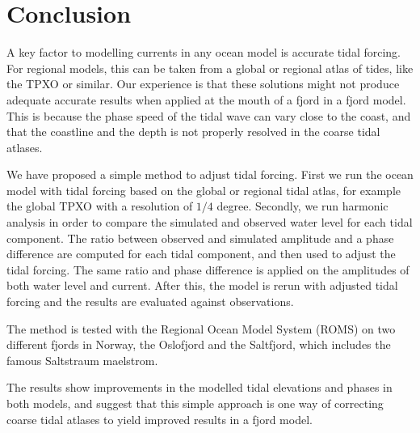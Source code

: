 \section{Conclusion}

A key factor to modelling currents in any ocean model is accurate tidal forcing. For regional models, this can be taken from a global or regional atlas of tides, like the TPXO or similar. Our experience is that these solutions might not produce adequate accurate results when applied at the mouth of a fjord in a fjord model. This is because the phase speed of the tidal wave can vary close to the coast, and that the coastline and the depth is not properly resolved in the coarse tidal atlases.

We have proposed a simple method to adjust tidal forcing. First we run the ocean model with tidal forcing based on the global or regional tidal atlas, for example the global TPXO with a resolution of $1/4$ degree. Secondly, we run harmonic analysis in order to compare the simulated and observed water level for each tidal component. The ratio between observed and simulated amplitude and a phase difference are computed for each tidal component, and then used to adjust the tidal forcing. The same ratio and phase difference is applied on the amplitudes of both water level and current. After this, the model is rerun with adjusted tidal forcing and the results are evaluated against observations.

The method is tested with the Regional Ocean Model System (ROMS) on two different fjords in Norway, the Oslofjord and the Saltfjord, which includes the famous Saltstraum maelstrom.
 
The results show improvements in the modelled tidal elevations and phases in both models, and suggest that this simple approach is one way of correcting coarse tidal atlases to yield improved results in a fjord model.

